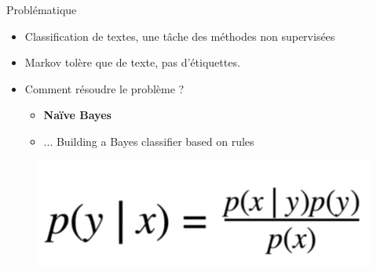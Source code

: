 \documentclass[aspectratio=169,xcolor=dvipsnames, t]{beamer}
\begin{document}
\begin{frame}{Problématique}
	\begin{itemize}
		\item Classification de textes, une tâche des méthodes non supervisées
		\item Markov tolère que de texte, pas d’étiquettes.
		\item Comment résoudre le problème ?
			\begin{itemize}
				\item \textbf{Naïve Bayes}
				\item ... Building a Bayes classifier based on rules
			\end{itemize}
	\end{itemize}
	
	\begin{figure}
		\includegraphics[height=0.25\paperheight]{figures/eq1.png}
	\end{figure}
	
\end{frame}
\end{document}
